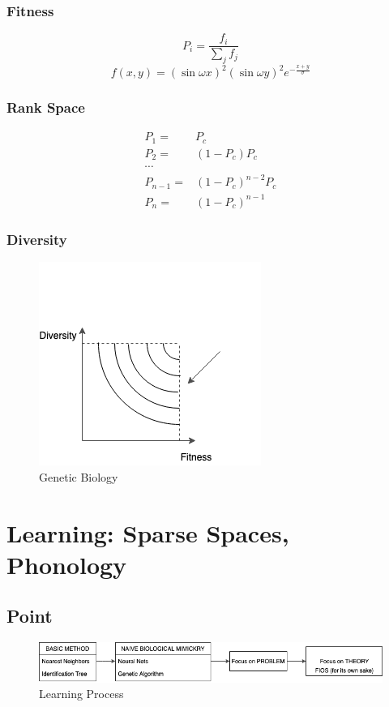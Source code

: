 \documentclass[12pt]{book}
\begin{document}
\subsubsection{Fitness}
$$P_i = \frac{f_i}{\sum_j f_j}$$
$$f(x,y)=(\sin\omega x)^2(\sin\omega y)^2e^{-\frac{x+y}{\sigma}}$$
\subsubsection{Rank Space}
\begin{equation*}
\begin{aligned}
P_1 = &P_c\\
P_2 = &(1-P_c)P_c\\
\cdots\\
P_{n-1}=&(1-P_c)^{n-2}P_c\\
P_n = & (1-P_c)^{n-1}
\end{aligned}
\end{equation*}
\subsubsection{Diversity}
\begin{figure}[ht]
	\centering
	\includegraphics[scale=0.7]{Figure/Figure13_3.png}
	\caption{Genetic Biology}
\end{figure}
\newpage
\section{Learning: Sparse Spaces, Phonology}
\subsection{Point}
\begin{figure}[ht]
	\centering
	\includegraphics[scale=0.65]{Figure/Figure14_1.png}
	\caption{Learning Process}
\end{figure}
\end{document}
